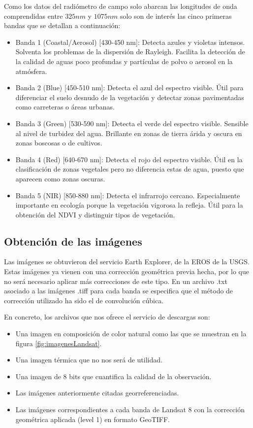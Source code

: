 Como los datos del radiómetro de campo solo abarcan las longitudes de onda comprendidas entre $325 nm$ y $1075 nm$ solo son de interés las cinco primeras bandas que se detallan a continuación:

\begin{itemize}
	\item Banda 1 (Coastal/Aerosol) [430-450 nm]: Detecta azules y violetas intensos. Solventa los problemas de la dispersión de Rayleigh. Facilita la detección de la calidad de aguas poco profundas y partículas de polvo o aerosol en la atmósfera.
	\item Banda 2 (Blue) [450-510 nm]: Detecta el azul del espectro visible. Útil para diferenciar el suelo desnudo de la vegetación y detectar zonas pavimentadas como carreteras o áreas urbanas.
	\item Banda 3 (Green) [530-590 nm]: Detecta el verde del espectro visible. Sensible al nivel de turbidez del agua. Brillante en zonas de tierra árida y oscura en zonas boscosas o de cultivos.
	\item Banda 4 (Red) [640-670 nm]: Detecta el rojo del espectro visible. Útil en la clasificación de zonas vegetales pero no diferencia estas de agua, puesto que aparecen como zonas oscuras.
	\item Banda 5 (NIR) [850-880 nm]: Detecta el infrarrojo cercano. Especialmente importante en ecología porque la vegetación vigorosa la refleja. Útil para la obtención del \ac{NDVI} y distinguir tipos de vegetación.
\end{itemize}


\subsection{Obtención de las imágenes}
Las imágenes se obtuvieron del servicio Earth Explorer, de la \ac{EROS} de la \ac{USGS}. Estas imágenes ya vienen con una corrección geométrica previa hecha, por lo que no será necesario aplicar más correcciones de este tipo. En un archivo .txt asociado a las imágenes .tiff para cada banda se especifica que el método de corrección utilizado ha sido el de convolución cúbica.\Sep

En concreto, los archivos que nos ofrece el servicio de descargas son:
\begin{itemize}
	\item Una imagen en composición de color natural como las que se muestran en la figura \ref{fig:imagenesLandsat}.
	\item Una imagen térmica que no nos será de utilidad.
	\item Una imagen de 8 bits que cuantifica la calidad de la observación.
	\item Las imágenes anteriormente citadas georreferenciadas.
	\item Las imágenes correspondientes a cada banda de Landsat 8 con la corrección geométrica aplicada (level 1) en formato GeoTIFF.
\end{itemize}

